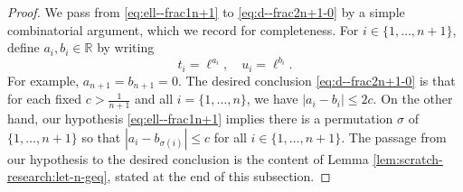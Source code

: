 \begin{proof}
  We pass from \eqref{eq:ell--frac1n+1} to \eqref{eq:d--frac2n+1-0} by a simple combinatorial argument, which we record for completeness.  For $i \in \{1,\dotsc,n+1\}$, define $a_i,b_i \in \mathbb{R}$ by writing
  \begin{equation*}
    t_i = \ell^{a_i}, \quad u_i = \ell^{b_i}.
  \end{equation*}
  For example, $a_{n+1} = b_{n+1} = 0$.  The desired conclusion \eqref{eq:d--frac2n+1-0} is that for each fixed $c > \frac{1}{n+1}$ and all $i = \{1, \dotsc, n\}$, we have $|a_i - b_i| \leq 2 c$.  On the other hand, our hypothesis \eqref{eq:ell--frac1n+1} implies there is a permutation $\sigma$ of $\{1,\dotsc,n+1\}$ so that $|a_i - b_{\sigma(i)}| \leq c$ for all $i \in \{1, \dotsc, n+1\}$.  The passage from our hypothesis to the desired conclusion is the content of
  Lemma \ref{lem:scratch-research:let-n-geq}, stated at the end of this subsection.
\end{proof}


